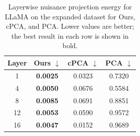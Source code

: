 \begin{table}[!htbp]
\centering
\small
\setlength{\tabcolsep}{8pt}
\renewcommand{\arraystretch}{1.15}
\begin{tabular}{cccc}
\toprule
Layer & Ours $\downarrow$ & cPCA $\downarrow$ & PCA $\downarrow$ \\
\midrule
1  & \textbf{0.0025} & 0.0323 & 0.7320 \\
4  & \textbf{0.0050} & 0.0676 & 0.5584 \\
8  & \textbf{0.0085} & 0.0691 & 0.8851 \\
12 & \textbf{0.0053} & 0.0590 & 0.9572 \\
16 & \textbf{0.0047} & 0.0152 & 0.9689 \\
\bottomrule
\end{tabular}
\vspace{0.4em}
\caption{Layerwise nuisance projection energy for LLaMA on the expanded dataset for Ours, cPCA, and PCA. Lower values are better; the best result in each row is shown in bold.}
\label{tab:cpca_layerwise}
\vspace{-1.0em}
\end{table} 






